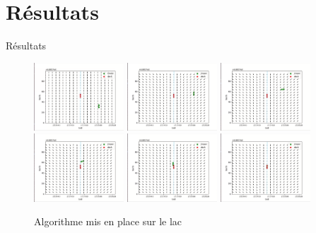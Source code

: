 \documentclass[pdftex,beamer,aspectratio=169]{beamer}
\theoremstyle{definition}
\theoremstyle{example}
\theoremstyle{plain}
\begin{document}
\section{Résultats}

\begin{frame}[fragile]{Résultats}
  \begin{figure}
    \centering
    \includegraphics[width=0.3\textwidth]{drone_exp1_1.png}
    \includegraphics[width=0.3\textwidth]{drone_exp1_2.png}
    \includegraphics[width=0.3\textwidth]{drone_exp1_3.png}
    \includegraphics[width=0.3\textwidth]{drone_exp1_4.png}
    \includegraphics[width=0.3\textwidth]{drone_exp1_5.png}
    \includegraphics[width=0.3\textwidth]{drone_exp1_6.png}
    \caption*{Algorithme mis en place sur le lac}
    
  \end{figure}
\end{frame}
\end{document}
